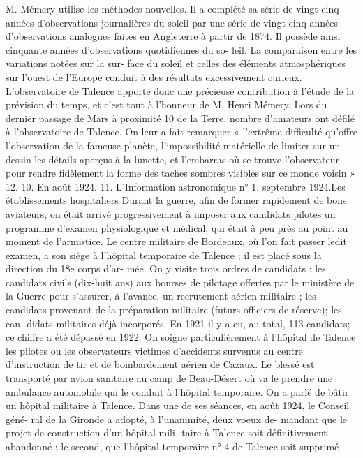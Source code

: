 \documentclass[a4paper,11pt]{book}
\begin{document}
M. Mémery utilise les méthodes nouvelles. Il a complété sa
série de vingt-cinq années d'observations journalières du
soleil par une série de vingt-cinq années d'observations
analogues faites en Angleterre à partir de 1874. Il possède
ainsi cinquante années d'observations quotidiennes du so-
leil.
La comparaison entre les variations notées sur la sur-
face du soleil et celles des éléments atmosphériques sur
l'ouest de l'Europe conduit à des résultats excessivement
curieux.
L'observatoire de Talence apporte donc une précieuse
contribution à l'étude de la prévision du temps, et c'est
tout à l'honneur de M. Henri Mémery.
Lors du dernier passage de Mars à proximité 10 de la
Terre, nombre d'amateurs ont défilé à l'observatoire de
Talence. On leur a fait remarquer « l'extrême difficulté
qu'offre l'observation de la fameuse planète, l'impossibilité
matérielle de limiter sur un dessin les détails aperçus à
la lunette, et l'embarras où se trouve l'observateur pour
rendre fidèlement la forme des taches sombres visibles
sur ce monde voisin » 12.
10. En août 1924.
11. L'Information astronomique n° 1, septembre 1924.Les établissements hospitaliers
Durant la guerre, afin de former rapidement de bons
aviateurs, on était arrivé progressivement à imposer aux
candidats pilotes un programme d'examen physiologique
et médical, qui était à peu près au point au moment de
l'armistice. Le centre militaire de Bordeaux, où l'on fait
passer ledit examen, a son siège à l'hôpital temporaire
de Talence ; il est placé sous la direction du 18e corps d'ar-
mée. On y visite trois ordres de candidats : les candidats
civils (dix-huit ans) aux bourses de pilotage offertes par
le ministère de la Guerre pour s'assurer, à l'avance, un
recrutement aérien militaire ; les candidats provenant de la
préparation militaire (futurs officiers de réserve); les can-
didats militaires déjà incorporés. En 1921 il y a eu, au
total, 113 candidats; ce chiffre a été dépassé en 1922.
On soigne particulièrement à l'hôpital de Talence les
pilotes ou les observateurs victimes d'accidents survenus
au centre d'instruction de tir et de bombardement aérien
de Cazaux. Le blessé est transporté par avion sanitaire
au camp de Beau-Désert où va le prendre une ambulance
automobile qui le conduit à l'hôpital temporaire.
On a parlé de bâtir un hôpital militaire à Talence.
Dans une de ses séances, en août 1924, le Conseil géné-
ral de la Gironde a adopté, à l'unanimité, deux voeux de-
mandant que le projet de construction d'un hôpital mili-
taire à Talence soit définitivement abandonné ; le second,
que l'hôpital temporaire n° 4 de Talence soit supprimé
\end{document}
